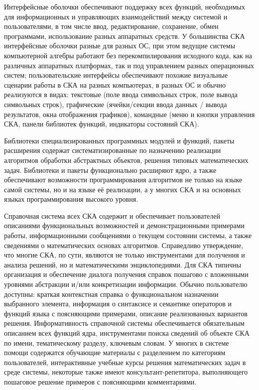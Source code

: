 Интерфейсные оболочки обеспечивают поддержку всех функций, необходимых для информационных и управляющих взаимодействий между системой и пользователями, в том числе ввод, редактирование, сохранение, обмен программами, использование разных аппаратных средств. У большинства СКА интерфейсные оболочки разные для разных ОС, при этом ведущие системы компьютерной алгебры работают без перекомпилирования исходного кода, как на различных аппаратных платформах, так и под управлением разных операционных систем; пользовательские интерфейсы обеспечивают похожие визуальные сценарии работы в СКА на разных компьютерах, в разных ОС и обычно реализуются в видах: текстовые (поле ввода символьных строк, поле вывода символьных строк), графические (ячейки/секции ввода данных / вывода результатов, окна отображения графиков), командные (меню и кнопки управления СКА, панели библиотек функций, индикаторы состояний СКА).

Библиотеки специализированных программных модулей и функций, пакеты расширения содержат систематизированные по назначению реализации алгоритмов обработки абстрактных объектов, решения типовых математических задач. Библиотеки и пакеты функционально расширяют ядро, а также обеспечивают возможности программирования алгоритмов не только на языке самой системы, но и на языке её реализации, а у многих СКА и на основных языках программирования высокого уровня.

Справочная система всех СКА содержит и обеспечивает пользователей описаниями функциональных возможностей и демонстрационными примерами работы, информационными сообщениями о текущем состоянии системы, а также сведениями о математических основах алгоритмов. Справедливо утверждение, что многие СКА, по сути, являются не только инструментами для получения и анализа решений, но и математическими энциклопедиями. Для СКА типичны организация и обеспечение диалога получения справок пошагово с вложенными уровнями абстракции и/или конкретизации информации. Обычно пользователю доступны: краткая контекстная справка о функциональном назначении выбранного элемента, информация о синтаксисе и семантике операторов и функций языка с поясняющими примерами, описание реализованных вариантов решения. Информативность справочной системы обеспечивается обязательным описанием всех функций ядра, инструментами поиска сведений об объекте СКА по имени, тематическому разделу, ключевым словам. У многих в системе помощи содержатся обучающие материалы с разделением по категориям пользователей, интерактивные учебные курсы решения математических задач в среде системы, некоторые также имеют консультант-репетитора, выполняющего пошаговое решение примеров с поясняющими комментариями.

